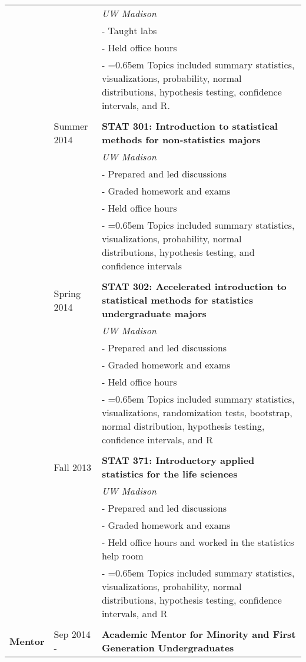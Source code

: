 \documentclass[10pt, oneside]{article}
\begin{document}
\begin{longtable}{p{1.4cm}p{2.1cm}p{13cm}}
& & \emph{UW Madison}\\
& & - Taught labs\\
& & - Held office hours\\
& & - \hangindent=0.65em \hangafter=1 Topics included summary statistics, visualizations, probability, normal distributions, hypothesis testing, confidence intervals, and R.\\
\\
& \hfill{Summer 2014} & \textbf{STAT 301: Introduction to statistical methods for non-statistics majors}\\
& & \emph{UW Madison}\\
& & - Prepared and led discussions\\
& & - Graded homework and exams\\
& & - Held office hours\\
& & - \hangindent=0.65em \hangafter=1 Topics included summary statistics, visualizations, probability, normal distributions, hypothesis testing, and confidence intervals\\
\\
& \hfill{Spring 2014} & \textbf{STAT 302: Accelerated introduction to statistical methods for statistics undergraduate majors}\\
& & \emph{UW Madison}\\
& & - Prepared and led discussions\\
& & - Graded homework and exams\\
& & - Held office hours\\
& & - \hangindent=0.65em \hangafter=1 Topics included summary statistics, visualizations, randomization tests, bootstrap, normal distribution, hypothesis testing, confidence intervals, and R\\
\\
& \hfill{Fall 2013} & \textbf{STAT 371: Introductory applied statistics for the life sciences}\\
& & \emph{UW Madison}\\
& & - Prepared and led discussions\\
& & - Graded homework and exams\\
& & - Held office hours and worked in the statistics help room\\
& & - \hangindent=0.65em \hangafter=1 Topics included summary statistics, visualizations, probability, normal distributions, hypothesis testing, confidence intervals, and R\\
\\
\textbf{Mentor} & \hfill{Sep 2014 - } & \textbf{Academic Mentor for Minority and First Generation Undergraduates}\\

\end{longtable}
\end{document}
